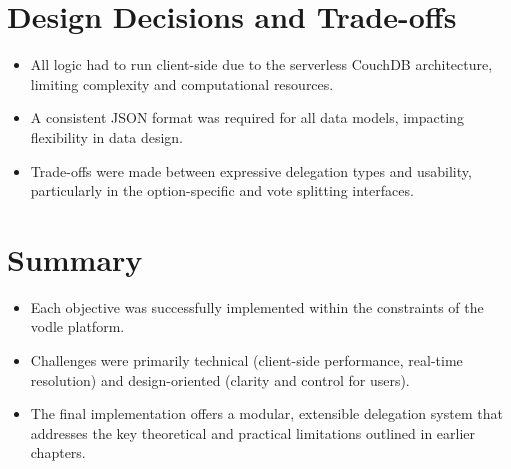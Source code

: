 \section{Design Decisions and Trade-offs}
\begin{itemize}
  \item All logic had to run client-side due to the serverless CouchDB architecture, limiting complexity and computational resources.
  \item A consistent JSON format was required for all data models, impacting flexibility in data design.
  \item Trade-offs were made between expressive delegation types and usability, particularly in the option-specific and vote splitting interfaces.
\end{itemize}

\section{Summary}
\begin{itemize}
  \item Each objective was successfully implemented within the constraints of the vodle platform.
  \item Challenges were primarily technical (client-side performance, real-time resolution) and design-oriented (clarity and control for users).
  \item The final implementation offers a modular, extensible delegation system that addresses the key theoretical and practical limitations outlined in earlier chapters.
\end{itemize}

